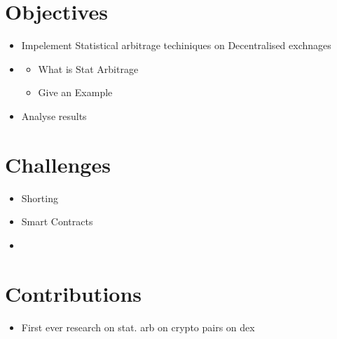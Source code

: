 \section{Objectives}
\begin{itemize}
    \item Impelement Statistical arbitrage techiniques on Decentralised exchnages
    \item \begin{itemize}
        \item What is Stat Arbitrage
        \item Give an Example
    \end{itemize}
    \item Analyse results
\end{itemize}

\section{Challenges}
\begin{itemize}
    \item Shorting
    \item Smart Contracts
    \item 
\end{itemize}

\section{Contributions}
\begin{itemize}
    \item First ever research on stat. arb on crypto pairs on dex
\end{itemize}